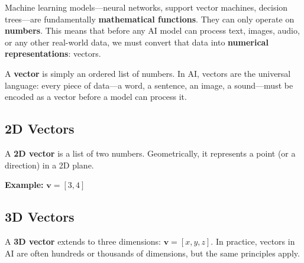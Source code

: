 \documentclass[11pt,a4paper]{article}
\begin{document}
Machine learning models---neural networks, support vector machines, decision trees---are fundamentally \textbf{mathematical functions}. They can only operate on \textbf{numbers}. This means that before any AI model can process text, images, audio, or any other real-world data, we must convert that data into \textbf{numerical representations}: vectors.

\begin{tcolorbox}[intuitionbox={Key Insight}]
A \textbf{vector} is simply an ordered list of numbers. In AI, vectors are the universal language: every piece of data---a word, a sentence, an image, a sound---must be encoded as a vector before a model can process it.
\end{tcolorbox}

\subsection{2D Vectors}

A \textbf{2D vector} is a list of two numbers. Geometrically, it represents a point (or a direction) in a 2D plane.

\textbf{Example:} $\mathbf{v} = [3, 4]$

\begin{center}
\end{center}

\subsection{3D Vectors}

A \textbf{3D vector} extends to three dimensions: $\mathbf{v} = [x, y, z]$. In practice, vectors in AI are often hundreds or thousands of dimensions, but the same principles apply.
\end{document}
